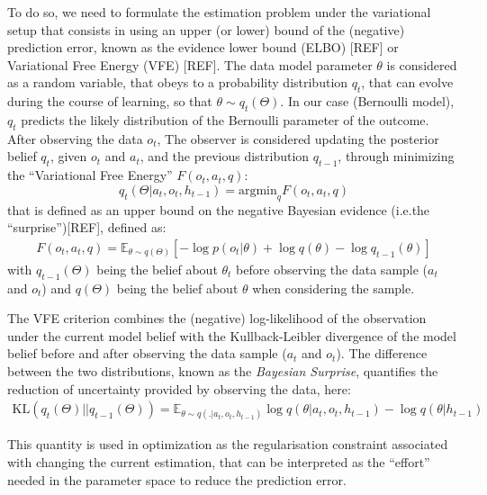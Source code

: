\documentclass[10pt,letterpaper]{article}
\begin{document}
To do so, we need to formulate the estimation problem under the variational setup that consists in using an upper (or lower) bound of the (negative) prediction error, known as the evidence lower bound (ELBO) [REF] or Variational Free Energy (VFE) [REF]. The data model parameter $\theta$ is considered as a random variable, that obeys to a probability distribution $q_t$, that can evolve during the course of learning, so that $\theta\sim q_t(\Theta)$. 
In our case (Bernoulli model), $q_t$ predicts the likely distribution of the Bernoulli parameter of the outcome. After observing the data $o_t$, The observer is considered updating the posterior belief  $q_t$, given $o_t$ and $a_t$, and the previous distribution $q_{t-1}$, %
through minimizing the ``Variational Free Energy'' $F(o_t,a_t,q)$:
$$q_t(\Theta|a_t, o_t, h_{t-1}) = \text{argmin}_{q} F(o_t,a_t,q)$$
that is defined as an upper bound on the negative Bayesian evidence (i.e.the ``surprise'')[REF], defined as: %
\begin{align}\label{eq:VFE}
F(o_t,a_t,q) = \mathbb{E}_{\theta\sim q(\Theta)}\left[ -\log p(o_t|\theta) + \log q(\theta) - \log q_{t-1}(\theta)\right]
\end{align}
with  $q_{t-1}(\Theta)$ being the belief about $\theta_t$ before observing the data sample ($a_t$ and $o_t$) and $q(\Theta)$ being the belief about $\theta$ when considering the sample.

The VFE criterion combines the (negative) log-likelihood of the observation under the current model belief with the Kullback-Leibler divergence of the model belief before and after observing the data sample ($a_t$ and $o_t$). The difference between the two distributions, known as the \emph{Bayesian Surprise}, quantifies the reduction of uncertainty provided by observing the data, here:
\begin{align}\label{eq:BS}
\text{KL}(q_t(\Theta)||q_{t-1}(\Theta)) =\mathbb{E}_{\theta \sim q(.|a_t, o_t, h_{t-1})} \log q(\theta|a_t, o_t, h_{t-1}) - \log q(\theta|h_{t-1})    
 \end{align}

This quantity is used in optimization as the regularisation constraint associated with changing the current estimation, that can be interpreted as the ``effort'' needed in the parameter space to reduce the prediction error. 
\end{document}
